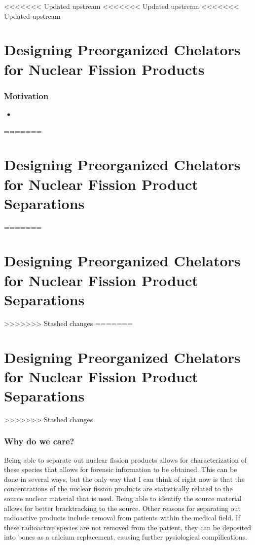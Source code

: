 <<<<<<< Updated upstream
<<<<<<< Updated upstream
<<<<<<< Updated upstream
\section{Designing Preorganized Chelators for Nuclear Fission Products}

\begin{frame}
\frametitle{Motivation}
\begin{itemize}
	\item 
\end{itemize}
=======
\section{Designing Preorganized Chelators for Nuclear Fission Product Separations}

\begin{frame}
=======
\section{Designing Preorganized Chelators for Nuclear Fission Product Separations}

\begin{frame}
>>>>>>> Stashed changes
=======
\section{Designing Preorganized Chelators for Nuclear Fission Product Separations}

\begin{frame}
>>>>>>> Stashed changes
\sectionpage
\end{frame}

\begin{frame}
\frametitle{Why do we care?}
Being able to separate out nuclear fission products allows for characterization of these species that allows for forensic information to be obtained. This can be done in several ways, but the only way that I can think of right now is
that the concentrations of the nuclear fission products are statistically related to the source nuclear material that is used. Being able to identify the source material allows for better bracktracking to the source. Other reasons for
separating out radioactive products include removal from patients within the medical field. If these radioactive species are not removed from the patient, they can be deposited into bones as a calcium replacement, causing further
pysiological compilications. 
\end{frame}


\end{frame}
\end{frame}
\end{frame}
